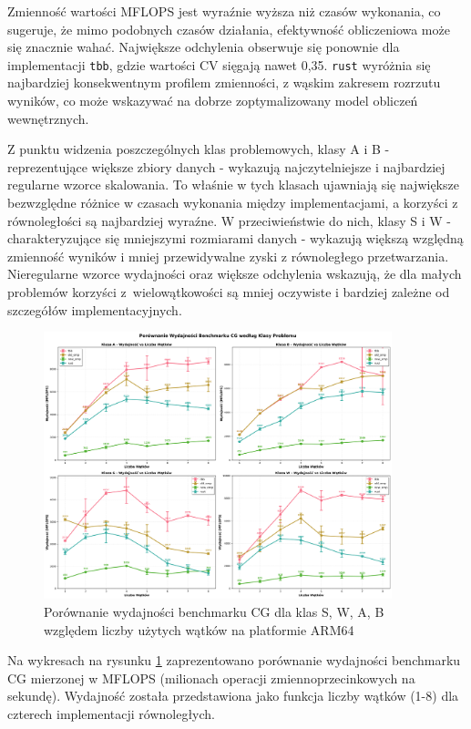 Zmienność wartości MFLOPS jest wyraźnie wyższa niż czasów wykonania, co sugeruje, że mimo podobnych czasów działania, efektywność obliczeniowa może się znacznie wahać. Największe odchylenia obserwuje się ponownie dla implementacji \texttt{tbb}, gdzie wartości CV sięgają nawet 0,35. \texttt{rust} wyróżnia się najbardziej konsekwentnym profilem zmienności, z wąskim zakresem rozrzutu wyników, co może wskazywać na dobrze zoptymalizowany model obliczeń wewnętrznych.

Z punktu widzenia poszczególnych klas problemowych, klasy A i B - reprezentujące większe zbiory danych - wykazują najczytelniejsze i najbardziej regularne wzorce skalowania. To właśnie w tych klasach ujawniają się największe bezwzględne różnice w czasach wykonania między implementacjami, a korzyści z równoległości są najbardziej wyraźne. W przeciwieństwie do nich, klasy S i W - charakteryzujące się mniejszymi rozmiarami danych - wykazują większą względną zmienność wyników i mniej przewidywalne zyski z równoległego przetwarzania. Nieregularne wzorce wydajności oraz większe odchylenia wskazują, że dla małych problemów korzyści z~wielowątkowości są mniej oczywiste i bardziej zależne od szczegółów implementacyjnych.

\begin{figure}[H]
    \centering
    \includegraphics[width=0.9\textwidth]{analiza/images/parallel/cg/arm/cg_porownanie_wydajnosci.png}
    \caption{Porównanie wydajności benchmarku CG dla klas S, W, A, B względem liczby użytych wątków na platformie ARM64}
    \label{cg_porownanie_wydajnosci}
\end{figure}
Na wykresach na rysunku \ref{cg_porownanie_wydajnosci} zaprezentowano porównanie wydajności benchmarku CG mierzonej w MFLOPS (milionach operacji zmiennoprzecinkowych na sekundę). Wydajność została przedstawiona jako funkcja liczby wątków (1-8) dla czterech implementacji równoległych.

